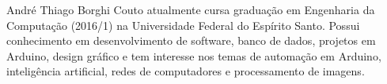 \documentclass[10pt,journal,compsoc]{IEEEtran}
\begin{document}

\begin{IEEEbiographynophoto}{André Thiago Borghi Couto}
atualmente cursa graduação em Engenharia da Computação (2016/1) na Universidade Federal do Espírito Santo. Possui conhecimento em desenvolvimento de software, banco de dados, projetos em Arduino, design gráfico e tem interesse nos temas de automação em Arduino, inteligência artificial, redes de computadores e processamento de imagens.
\end{IEEEbiographynophoto}
\end{document}
